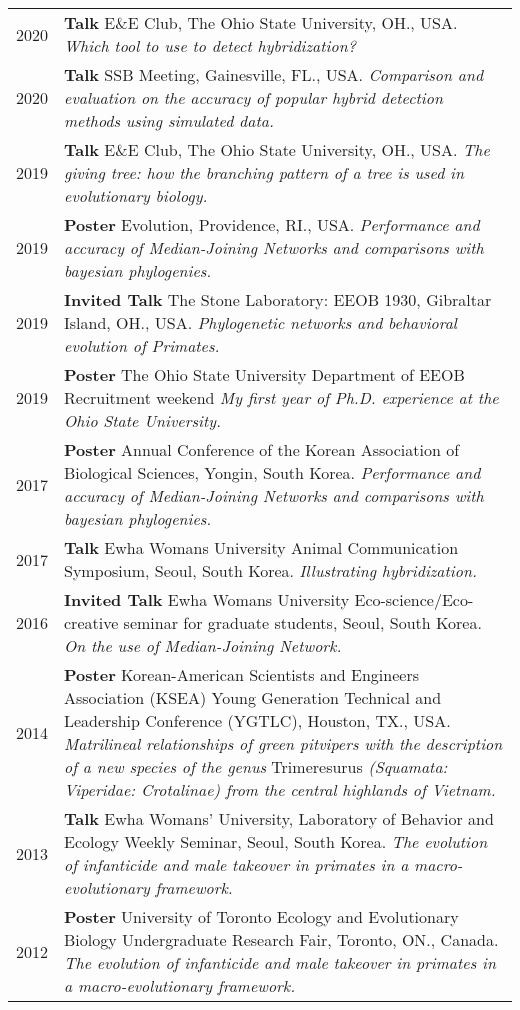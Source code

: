 \documentclass[10pt]{article}
\begin{document}
\begin{longtable}{p{}  p{}}
2020 & \textbf{Talk}  E\&E Club, The Ohio State University, OH., USA. \textit{Which tool to use to detect hybridization?}\\ 
2020 & \textbf{Talk}  SSB Meeting, Gainesville, FL., USA. \textit{Comparison and evaluation on the accuracy of popular hybrid detection methods using simulated data.}\\ 
2019 & \textbf{Talk}  E\&E Club, The Ohio State University, OH., USA. \textit{The giving tree: how the branching pattern of a tree is used in evolutionary biology.}\\
2019 &  \textbf{Poster} Evolution, Providence, RI., USA. \textit{Performance and accuracy of Median-Joining Networks and comparisons with bayesian phylogenies.}\\  
2019 & \textbf{Invited Talk} The Stone Laboratory: EEOB 1930, Gibraltar Island, OH., USA. \textit{Phylogenetic networks and behavioral evolution of Primates.}\\
2019 & \textbf{Poster} The Ohio State University Department of EEOB Recruitment weekend \textit{My first year of Ph.D. experience at the Ohio State University.}\\
2017 & \textbf{Poster} Annual Conference of the Korean Association of Biological Sciences, Yongin, South Korea. \textit{Performance and accuracy of Median-Joining Networks and comparisons with bayesian phylogenies.}\\
2017 & \textbf{Talk} Ewha Womans University Animal Communication Symposium, Seoul, South Korea. \textit{Illustrating hybridization.}\\
2016 & \textbf{Invited Talk} Ewha Womans University Eco-science/Eco-creative seminar for graduate students, Seoul, South Korea. \textit{On the use of Median-Joining Network.}\\
2014 & \textbf{Poster} Korean-American Scientists and Engineers Association (KSEA) Young Generation Technical and Leadership Conference (YGTLC), Houston, TX., USA. \textit{Matrilineal relationships of green pitvipers with the description of a new species of the genus} Trimeresurus \textit{(Squamata: Viperidae: Crotalinae) from the central highlands of Vietnam.}\\
2013 & \textbf{Talk} Ewha Womans’ University, Laboratory of Behavior and Ecology Weekly Seminar, Seoul, South Korea. \textit{The evolution of infanticide and male takeover in primates in a macro-evolutionary framework.}\\
2012 & \textbf{Poster} University of Toronto Ecology and Evolutionary Biology Undergraduate Research Fair, Toronto, ON., Canada. \textit{The evolution of infanticide and male takeover in primates in a macro-evolutionary framework.}\\
\end{longtable}
\end{document}
